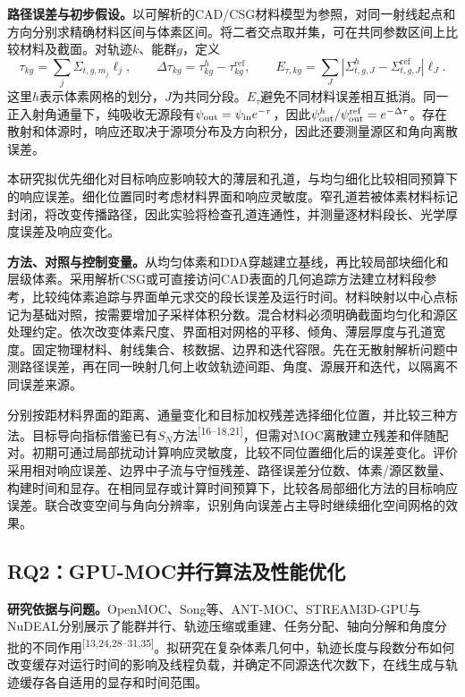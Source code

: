 \documentclass[UTF8, zihao=-4, fontset=none, a4paper]{ctexart}
\newcommand{\upcite}[1]{\textsuperscript{[#1]}}
\begin{document}
\textbf{路径误差与初步假设。}以可解析的CAD/CSG材料模型为参照，对同一射线起点和方向分别求精确材料区间与体素区间。将二者交点取并集，可在共同参数区间上比较材料及截面。对轨迹\(k\)、能群\(g\)，定义
\begin{equation}
\tau_{kg}=\sum_j\Sigma_{t,g,m_j}\ell_j,\qquad
\Delta\tau_{kg}=\tau^{h}_{kg}-\tau^{\mathrm{ref}}_{kg},\qquad
E_{\tau,kg}=\sum_{J}\left|\Sigma^{h}_{t,g,J}-\Sigma^{\mathrm{ref}}_{t,g,J}\right|\ell_J.
\label{eq:patherror}
\end{equation}
这里\(h\)表示体素网格的划分，\(J\)为共同分段。\(E_{\tau}\)避免不同材料误差相互抵消。同一正入射角通量下，纯吸收无源段有\(\psi_{\rm out}=\psi_{\rm in}e^{-\tau}\)，因此\(\psi^h_{\rm out}/\psi^{\rm ref}_{\rm out}=e^{-\Delta\tau}\)。存在散射和体源时，响应还取决于源项分布及方向积分，因此还要测量源区和角向离散误差。

本研究拟优先细化对目标响应影响较大的薄层和孔道，与均匀细化比较相同预算下的响应误差。细化位置同时考虑材料界面和响应灵敏度。窄孔道若被体素材料标记封闭，将改变传播路径，因此实验将检查孔道连通性，并测量逐材料段长、光学厚度误差及响应变化。

\textbf{方法、对照与控制变量。}从均匀体素和DDA穿越建立基线，再比较局部块细化和层级体素。采用解析CSG或可直接访问CAD表面的几何追踪方法建立材料段参考，比较纯体素追踪与界面单元求交的段长误差及运行时间。材料映射以中心点标记为基础对照，按需要增加子采样体积分数。混合材料必须明确截面均匀化和源区处理约定。依次改变体素尺度、界面相对网格的平移、倾角、薄层厚度与孔道宽度。固定物理材料、射线集合、核数据、边界和迭代容限。先在无散射解析问题中测路径误差，再在同一映射几何上收敛轨迹间距、角度、源展开和迭代，以隔离不同误差来源。

分别按距材料界面的距离、通量变化和目标加权残差选择细化位置，并比较三种方法。目标导向指标借鉴已有\(S_N\)方法\upcite{16--18,21}，但需对MOC离散建立残差和伴随配对。初期可通过局部扰动计算响应灵敏度，比较不同位置细化后的误差变化。评价采用相对响应误差、边界中子流与守恒残差、路径误差分位数、体素/源区数量、构建时间和显存。在相同显存或计算时间预算下，比较各局部细化方法的目标响应误差。联合改变空间与角向分辨率，识别角向误差占主导时继续细化空间网格的效果。

\subsection{RQ2：GPU-MOC并行算法及性能优化}

\textbf{研究依据与问题。}OpenMOC、Song等、ANT-MOC、STREAM3D-GPU与NuDEAL分别展示了能群并行、轨迹压缩或重建、任务分配、轴向分解和角度分批的不同作用\upcite{13,24,28--31,35}。拟研究在复杂体素几何中，轨迹长度与段数分布如何改变缓存对运行时间的影响及线程负载，并确定不同源迭代次数下，在线生成与轨迹缓存各自适用的显存和时间范围。
\end{document}
